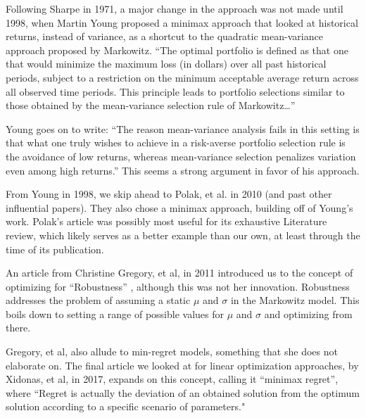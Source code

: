 \documentclass[11pt]{article} %
\begin{document}
Following Sharpe in 1971, a major change in the approach was not made until 1998, when Martin Young proposed a minimax approach that looked at historical returns, instead of variance, as a shortcut to the quadratic mean-variance approach proposed by Markowitz. ``The optimal portfolio is defined as that one that would minimize the maximum loss (in dollars) over all past historical periods, subject to a restriction on the minimum acceptable average return across all observed time periods. This principle leads to portfolio selections similar to those obtained by the mean-variance selection rule of Markowitz…” \cite{young}

Young goes on to write: ``The reason mean-variance analysis fails in this setting is that what one truly wishes to achieve in a risk-averse portfolio selection rule is the avoidance of low returns, whereas mean-variance selection penalizes variation even among high returns.” This seems a strong argument in favor of his approach.

From Young in 1998, we skip ahead to Polak, et al. in 2010 (and past other influential papers). They also chose a minimax approach, building off of Young’s work. Polak’s article was possibly most useful for its exhaustive Literature review, which likely serves as a better example than our own, at least through the time of its publication.

An article from Christine Gregory, et al, in 2011 introduced us to the concept of optimizing for ``Robustness” \cite{gregory} , although this was not her innovation. Robustness addresses the problem of assuming a static $\mu$ and $\sigma$ in the Markowitz model. This boils down to setting a range of possible values for $\mu$ and $\sigma$ and optimizing from there.

Gregory, et al, also allude to min-regret models, something that she does not elaborate on. The final article we looked at for linear optimization approaches, by Xidonas, et al, in 2017, expands on this concept, calling it ``minimax regret”, where ``Regret is actually the deviation of an obtained solution from the optimum solution according to a specific scenario of parameters." \cite{xidonas}
\end{document}
